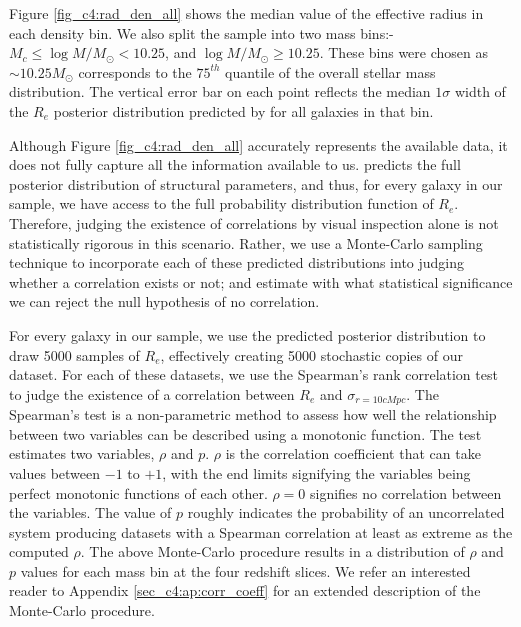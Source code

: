 \begin{table}
\begin{tabular}{c|c|M{2.4cm}M{2.4cm}M{2.4cm}M{2.4cm}}
    \end{tabular}
\end{table}

Figure \ref{fig_c4:rad_den_all} shows the median value of the effective radius in each density bin. We also split the sample into two mass bins:-  $M_c \leq \log M/M_{\odot} < 10.25$, and $\log M/M_{\odot} \geq 10.25$. These bins were chosen as $\sim10.25M_{\odot}$ corresponds to the $75^{th}$ quantile of the overall stellar mass distribution. The vertical error bar on each point reflects the median $1\sigma$ width of the $R_e$ posterior distribution predicted by \gampen{} for all galaxies in that bin. 

Although Figure \ref{fig_c4:rad_den_all} accurately represents the available data, it does not fully capture all the information available to us. \gampen{} predicts the full posterior distribution of structural parameters, and thus, for every galaxy in our sample, we have access to the full probability distribution function of $R_e$. Therefore, judging the existence of correlations by visual inspection alone is not statistically rigorous in this scenario. Rather, we use a Monte-Carlo sampling technique to incorporate each of these predicted distributions into judging whether a correlation exists or not; and estimate with what statistical significance we can reject the null hypothesis of no correlation. 

For every galaxy in our sample, we use the predicted posterior distribution to draw 5000 samples of $R_e$, effectively creating 5000 stochastic copies of our dataset. For each of these datasets, we use the Spearman's rank correlation test \citep{spearman_original} to judge the existence of a correlation between $R_e$ and $\sigma_{r=10cMpc}$. The Spearman's test is a non-parametric method to assess how well the relationship between two variables can be described using a monotonic function. The test estimates two variables, $\rho$ and $p$. $\rho$ is the correlation coefficient that can take values between $-1$ to $+1$, with the end limits signifying the variables being perfect monotonic functions of each other. $\rho=0$ signifies no correlation between the variables. The value of $p$ roughly indicates the probability of an uncorrelated system producing datasets with a Spearman correlation at least as extreme as the computed $\rho$. The above Monte-Carlo procedure results in a distribution of $\rho$ and $p$ values for each mass bin at the four redshift slices. We refer an interested reader to Appendix \ref{sec_c4:ap:corr_coeff} for an extended description of the Monte-Carlo procedure. 

